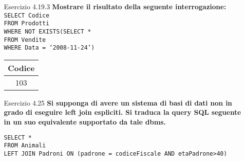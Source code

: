 \begin{frame}{Esercizio 4.19.3}
    \textbf{Mostrare il risultato della seguente interrogazione:}\\
    \texttt{SELECT Codice\\FROM Prodotti\\WHERE NOT EXISTS(SELECT *\\\hspace{8,5em}FROM Vendite\\\hspace{8,5em}WHERE Data = `2008-11-24')}
    \begin{table}[h]
    \centering
    \begin{minipage}{.45\textwidth}
    \centering
    \begin{tabular}{|c|}
    \hline
    \rowcolor{cyan!30} Codice \\
    \hline
    103\\
    \hline
    \end{tabular}
    \end{minipage}%
    \end{table}
\end{frame}
\begin{frame}{Esercizio 4.25}
    \textbf{Si supponga di avere un sistema di basi di dati non in grado di
eseguire left join espliciti. Si traduca la query SQL seguente in un suo equivalente
supportato da tale dbms.}
    \vspace{1em}
    
    \texttt{SELECT *\\FROM Animali \\LEFT JOIN Padroni ON (padrone = codiceFiscale AND etaPadrone>40)}
\end{frame}

